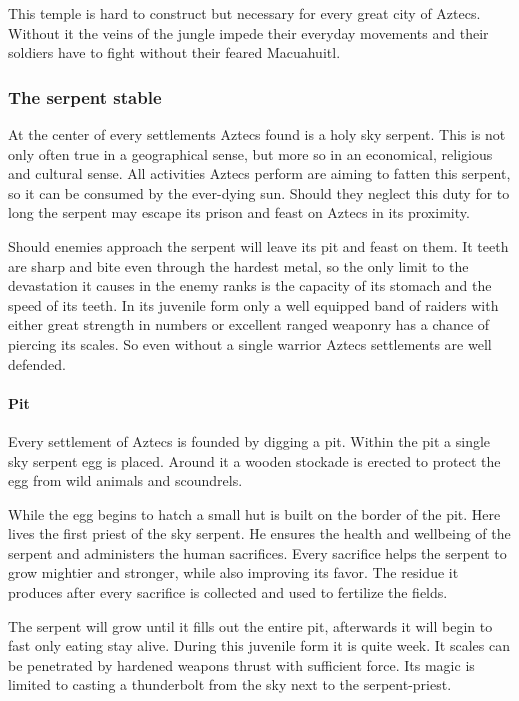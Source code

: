 \documentclass[a4paper]{article}
\begin{document}
			This temple is hard to construct but necessary for every great city of \gls{Aztecs}.
			Without it the veins of the jungle impede their everyday movements
			and their soldiers have to fight without their feared Macuahuitl.

		\subsubsection{The serpent stable}
			At the center of every settlements \gls{Aztecs} found is a holy sky serpent.
			This is not only often true in a geographical sense,
			but more so in an economical, religious and cultural sense.
			All activities \gls{Aztecs} perform are aiming to fatten this serpent,
			so it can be consumed by the ever-dying sun.
			Should they neglect this duty for to long the serpent may escape its prison
			and feast on \gls{Aztecs} in its proximity.

			Should enemies approach the serpent will leave its pit and feast on them.
			It teeth are sharp and bite even through the hardest metal,
			so the only limit to the devastation it causes in the enemy ranks
			is the capacity of its stomach and the speed of its teeth.
			In its juvenile form only a well equipped band of raiders with either great strength
			in numbers or excellent ranged weaponry has a chance of piercing its scales.
			So even without a single warrior \gls{Aztecs} settlements are well defended.

			\paragraph{Pit}
				Every settlement of \gls{Aztecs} is founded by digging a pit.
				Within the pit a single sky serpent egg is placed.
				Around it a wooden stockade is erected to protect the egg from
				wild animals and scoundrels.

				While the egg begins to hatch a small hut is built on the border of the pit.
				Here lives the first priest of the sky serpent.
				He ensures the health and wellbeing of the serpent and administers the human sacrifices.
				Every sacrifice helps the serpent to grow mightier and stronger,
				while also improving its favor.
				The residue it produces after every sacrifice is collected and used to fertilize the fields.

				The serpent will grow until it fills out the entire pit,
				afterwards it will begin to fast only eating stay alive.
				During this juvenile form it is quite week.
				It scales can be penetrated by hardened weapons thrust with sufficient force.
				Its magic is limited to casting a thunderbolt from the sky next
				to the serpent-priest.
\end{document}
